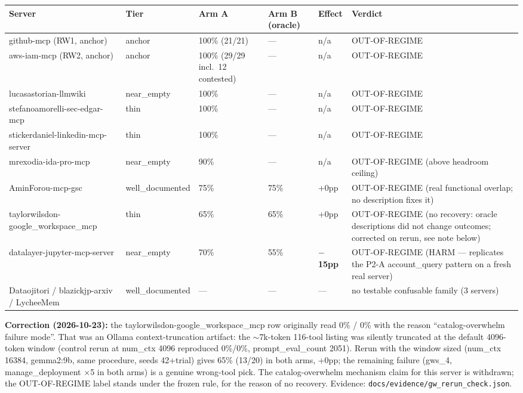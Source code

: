\begingroup
\footnotesize
\renewcommand{\arraystretch}{1.2}
\begin{longtable}{@{}p{}p{}p{}p{}p{}p{}@{}}
\toprule
\textbf{Server} & \textbf{Tier} & \textbf{Arm A} & \textbf{Arm B (oracle)} & \textbf{Effect} & \textbf{Verdict} \\
\midrule
\endhead
github-mcp (RW1, anchor) & anchor & 100\% (21/21) & --- & n/a &
OUT-OF-REGIME \\
aws-iam-mcp (RW2, anchor) & anchor & 100\% (29/29 incl.\ 12 contested) &
--- & n/a & OUT-OF-REGIME \\
lucasastorian-llmwiki & near\_empty & 100\% & --- & n/a &
OUT-OF-REGIME \\
stefanoamorelli-sec-edgar-mcp & thin & 100\% & --- & n/a &
OUT-OF-REGIME \\
stickerdaniel-linkedin-mcp-server & thin & 100\% & --- & n/a &
OUT-OF-REGIME \\
mrexodia-ida-pro-mcp & near\_empty & 90\% & --- & n/a & OUT-OF-REGIME
(above headroom ceiling) \\
AminForou-mcp-gsc & well\_documented & 75\% & 75\% & +0pp &
OUT-OF-REGIME (real functional overlap; no description fixes it) \\
taylorwilsdon-google\_workspace\_mcp & thin & 65\% & 65\% & +0pp &
OUT-OF-REGIME (no recovery: oracle descriptions did not change outcomes;
corrected on rerun, see note below) \\
datalayer-jupyter-mcp-server & near\_empty & 70\% & 55\% &
\textbf{$-$15pp} & OUT-OF-REGIME (HARM --- replicates the P2-A
account\_query pattern on a fresh real server) \\
Dataojitori / blazickjp-arxiv / LycheeMem & well\_documented & --- & ---
& --- & no testable confusable family (3 servers) \\
\bottomrule
\end{longtable}
\endgroup

\textbf{Correction (2026-10-23):} the taylorwilsdon-google\_workspace\_mcp
row originally read 0\% / 0\% with the reason ``catalog-overwhelm failure
mode''. That was an Ollama context-truncation artifact: the ${\sim}$7k-token
116-tool listing was silently truncated at the default 4096-token window
(control rerun at num\_ctx 4096 reproduced 0\%/0\%, prompt\_eval\_count
2051). Rerun with the window sized (num\_ctx 16384, gemma2:9b, same
procedure, seeds 42+trial) gives 65\% (13/20) in both arms, +0pp; the
remaining failure (gws\_4, manage\_deployment $\times$5 in both arms) is a
genuine wrong-tool pick. The catalog-overwhelm mechanism claim for this
server is withdrawn; the OUT-OF-REGIME label stands under the frozen rule,
for the reason of no recovery. Evidence:
\texttt{docs/evidence/gw\_rerun\_check.json}.

